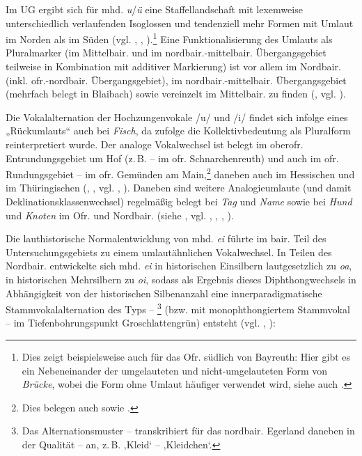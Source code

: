 Im UG ergibt sich für mhd. \textit{u}/\textit{ü} eine Staffellandschaft mit lexemweise unterschiedlich verlaufenden Isoglossen und tendenziell mehr Formen mit Umlaut im Norden als im Süden (vgl. \citealt[96]{Hinderling2004}, \citealt[Karte 7]{Gütter1971}, \citealt[Karte 158/159]{SNOB1}).\footnote{Dies zeigt beispielsweise auch \citet[41--42]{Wagner1964} für das Ofr. südlich von Bayreuth: Hier gibt es ein Nebeneinander der umgelauteten und nicht-umgelauteten Form von \textit{Brücke}, wobei die Form ohne Umlaut häufiger verwendet wird, siehe auch \citet[115]{Trukenbrod1973}.} Eine Funktionalisierung des Umlauts als Pluralmarker (im Mittelbair. und im nordbair.-mittelbair. Übergangsgebiet teilweise in Kombination mit additiver Markierung) ist vor allem im Nordbair. (inkl. ofr.-nordbair. Übergangsgebiet), im nordbair.-mittelbair. Übergangsgebiet (mehrfach belegt in Blaibach) sowie vereinzelt im Mittelbair. zu finden (, vgl. \citealt[Karte 141]{SNOB1}).

Die Vokalalternation der Hochzungenvokale /u/ und /i/ findet sich infolge eines „Rückumlauts“ \citep[443]{Schirmunski1962} auch bei \textit{Fisch}, da \citet{Schirmunski1962} zufolge die Kollektivbedeutung als Pluralform reinterpretiert wurde. Der analoge Vokalwechsel ist belegt im oberofr. Entrundungsgebiet um Hof (z.\,B.  --  im ofr. Schnarchenreuth) und auch im ofr. Rundungsgebiet  --  im ofr. Gemünden am Main,\footnote{Dies belegen auch \citet[20]{Köhler1934} sowie \citet[3]{Kübler1896}.} daneben auch im Hessischen und im Thüringischen (\citealt[118/119]{SNOB1}, \citealt[Karte 4]{SUF1}, vgl. \citealt[1198]{Dingeldein1983}, \citealt[1087]{Lüssy1983}). Daneben sind weitere Analogieumlaute (und damit Deklinationsklassenwechsel) regelmäßig belegt bei \textit{Tag} und \textit{Name} sowie bei \textit{Hund} und \textit{Knoten} im Ofr. und Nordbair. (siehe , vgl. \citealt[45]{Denz1977}, \citealt[85]{Kemmeter1924}, \citealt[§128 und 796]{Schmeller1821}, \citealt[75]{Zehetner1978}).

\label{sec:7.1.2.1.2}
Die lauthistorische Normalentwicklung von mhd. \textit{ei} führte im bair. Teil des Untersuchungsgebiets zu einem umlautähnlichen Vokalwechsel. In Teilen des Nordbair. entwickelte sich mhd. \textit{ei} in historischen Einsilbern lautgesetzlich zu \textit{oa}, in historischen Mehrsilbern zu \textit{oi}, sodass als Ergebnis dieses Diphthongwechsels in Abhängigkeit von der historischen Silbenanzahl eine innerparadigmatische Stammvokalalternation des Typs  -- \footnote{Das Alternationsmuster  --  transkribiert \citet[94--95]{Roth1940} für das nordbair. Egerland daneben in der Qualität  --  an, z.\,B.  ‚Kleid‘ --  ‚Kleidchen‘.} (bzw. mit monophthongiertem Stammvokal  --  im Tiefenbohrungspunkt Groschlattengrün) entsteht (vgl. \citealt[§20h und Karte 16]{Kranzmayer1956}, \citealt[66 und Karte 12]{Rowley1997}):

